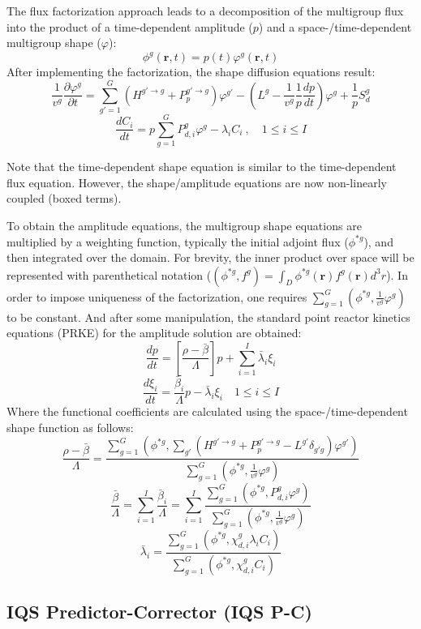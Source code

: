 \documentclass{anstrans}
\renewcommand{\vec}[1]{\bm{#1}} %
\newcommand{\be}{\begin{equation}}
\newcommand{\ee}{\end{equation}}
\begin{document}
The flux factorization approach leads to a decomposition of the multigroup flux into the product of a time-dependent amplitude ($p$) and a space-/time-dependent 
multigroup shape ($\varphi$):
\be
\phi^g(\vec{r},t)=p(t)\varphi^g(\vec{r},t)
\ee
After implementing the factorization, the shape diffusion equations result:
\be
\frac{1}{v^g}\frac{\partial \varphi^g}{\partial t} = \sum_{g'=1}^G \left(H^{g'\to g} + P_p^{g' \to g} \right) \varphi^{g'} - \left(L^g - \boxed{\frac{1}{v^g}\frac{1}{p}\frac{dp}{dt}}\right)\varphi^g + \boxed{\frac{1}{p}}S_{d}^g
\label{eq:flux}
\ee 
\be
\frac{dC_i}{dt} = \boxed{p}\sum_{g=1}^G P_{d,i}^g \varphi^{g} - \lambda_i C_i \ , \quad 1 \le i \le I 
\label{eq:precursor}
\ee

Note that the time-dependent shape equation is similar to the time-dependent flux equation. 
However, the shape/amplitude equations are now non-linearly coupled (boxed terms).

To obtain the amplitude equations, the multigroup shape equations are multiplied by a weighting function, typically the initial adjoint flux ($\phi^{*g}$), and then integrated over the domain.  For brevity, the inner product over space will be represented with parenthetical notation ($\left(\phi^{*g},f^g\right) = \int_D \phi^{*g}(\vec{r})f^g(\vec{r})d^3r
$). In order to impose uniqueness of the factorization, one requires $\sum_{g=1}^G\left(\phi^{*g},\frac{1}{v^g}\varphi^g\right)$ to be constant.  And after some manipulation, the standard point reactor kinetics equations (PRKE) for the amplitude solution are obtained:
\be
\frac{dp}{dt}=\left[\frac{\rho-\bar{\beta}}{\Lambda}\right]p+\sum_{i=1}^I\bar{\lambda}_i\xi_i
\ee
\be
\frac{d\xi_i}{dt}=\frac{\bar{\beta}_i}{\Lambda}p-\bar{\lambda}_i\xi_i \quad 1 \le i \le I 
\ee
Where the functional coefficients are calculated using the space-/time-dependent shape function as follows:
\be
\frac{\rho-\bar{\beta}}{\Lambda}=\frac{ \sum_{g=1}^G\left(\phi^{*g},\sum_{g'}(H^{g' \to g}+P_p^{g' \to g}-L^{g'}\delta_{g'g})\varphi^{g'}\right)}{\sum_{g=1}^G\left(\phi^{*g},\frac{1}{v^g}\varphi^g\right)}
\label{eq:rmb}
\ee
\be
\frac{\bar{\beta}}{\Lambda}=\sum_{i=1}^I\frac{\bar{\beta}_i}{\Lambda}=\sum_{i=1}^I\frac{\sum_{g=1}^G(\phi^{*g}, P_{d,i}^g \varphi^g)}{\sum_{g=1}^G\left(\phi^{*g},\frac{1}{v^g}\varphi^g\right)}
\ee
\be
\bar{\lambda}_i=\frac{\sum_{g=1}^G(\phi^{*g},\chi_{d,i}^g\lambda_i C_i)}{\sum_{g=1}^G(\phi^{*g},\chi_{d,i}^gC_i)}
\label{eq:l}
\ee

\subsection{IQS Predictor-Corrector (IQS P-C)}
\end{document}
